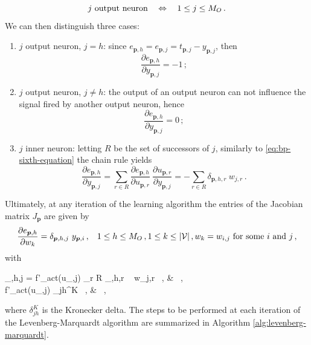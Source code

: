 \documentclass[12pt, a4paper, twoside, openright]{report}
\numberwithin{equation}{chapter}
\theoremstyle{theorem}
\theoremstyle{definition}
\theoremstyle{remark}
\theoremstyle{proposition}
\numberwithin{figure}{chapter}
\newcommand{\bg}[1]{\boldsymbol{#1}}
\begin{document}
		\begin{equation*}
			\text{$j$ output neuron \hspace*{0.2cm} $\Leftrightarrow$ \hspace*{0.2cm} $1 \leq j \leq M_O$} \, .
		\end{equation*} 
		We can then distinguish three cases:
		\begin{enumerate}[label=(\roman*)]
			\item $j$ output neuron, $j = h$: since $e_{\boldsymbol{p},h} = e_{\boldsymbol{p},j} = t_{\boldsymbol{p},j} - y_{\boldsymbol{p},j}$, then 
			\begin{equation}
				\label{eq:jacobian-first-case}
				\dfrac{\partial e_{\boldsymbol{p},h}}{\partial y_{\boldsymbol{p},j}} = -1 \, ;
			\end{equation}
			\item $j$ output neuron, $j \neq h$: the output of an output neuron can not influence the signal fired by another output neuron, hence 
			\begin{equation}
				\label{eq:jacobian-second-case}
				\dfrac{\partial e_{\boldsymbol{p},h}}{\partial y_{\boldsymbol{p},j}} = 0 \, ;
			\end{equation}
			\item $j$ inner neuron: letting $R$ be the set of successors of $j$, similarly to \eqref{eq:bp-sixth-equation} the chain rule yields
			\begin{equation}
				\label{eq:jacobian-third-case}
				\dfrac{\partial e_{\boldsymbol{p},h}}{\partial y_{\boldsymbol{p},j}} = \sum_{r \in R} \dfrac{\partial e_{\boldsymbol{p},h}}{\partial u_{\boldsymbol{p},r}} ~ \dfrac{\partial u_{\boldsymbol{p},r}}{\partial y_{\boldsymbol{p},j}} = - \sum_{r \in R} \delta_{\boldsymbol{p},h,r} ~ w_{j,r} \, .
			\end{equation}
		\end{enumerate}
		
		Ultimately, at any iteration of the learning algorithm the entries of the Jacobian matrix $J_{\boldsymbol{p}}$ are given by
		\begin{equation*}
			\dfrac{\partial e_{\bg{p},h}}{\partial w_k} = \delta_{\boldsymbol{p},h,j} ~ y_{\boldsymbol{p},i} \, , \hspace*{0.3cm} 1 \leq h \leq M_O \, , 1 \leq k \leq |\mathcal{V}| \, , \text{$w_k = w_{i,j}$ for some $i$ and $j$} \, ,
		\end{equation*}
		with
		\begin{subnumcases}{\delta_{,h,j} =}
			\label{eq:levenberg-marquardt-inner-neuron}
		   	f'_{act}(u_{,j}) \sum_{r \in R} \delta_{,h,r} ~ w_{j,r} \, , &  \, , \\
		   	\label{eq:levenberg-marquardt-output-neuron}
			f'_{act}(u_{,j}) \delta_{jh}^K \, , &  \, ,
		\end{subnumcases}
		where $\delta_{jh}^K$ is the Kronecker delta. The steps to be performed at each iteration of the Levenberg-Marquardt algorithm are summarized in Algorithm \ref{alg:levenberg-marquardt}.
		
\end{document}
